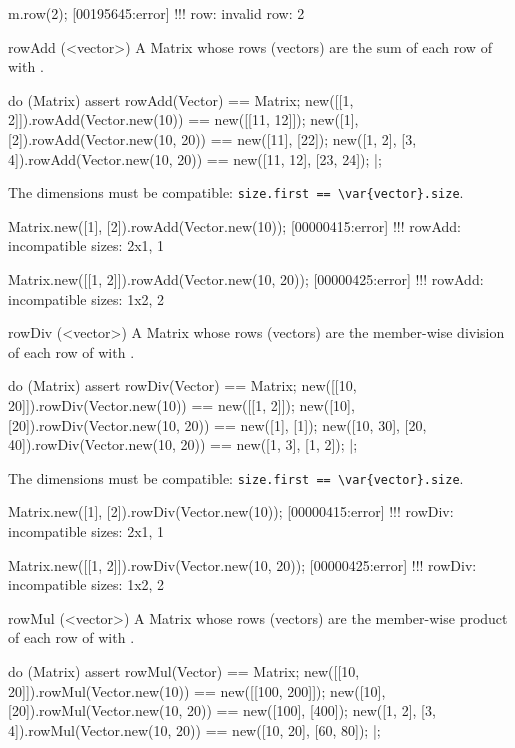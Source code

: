 \begin{urbiscriptapi}
\begin{urbiassert}
m.row(2);
[00195645:error] !!! row: invalid row: 2
\end{urbiassert}


\item[rowAdd](<vector>)%
  A Matrix whose rows (vectors) are the sum of each row of \this with
  .
\begin{urbiscript}
do (Matrix)
{
  assert
  {
    rowAdd(Vector) == Matrix;
    new([[1, 2]]).rowAdd(Vector.new(10))     == new([[11, 12]]);
    new([1], [2]).rowAdd(Vector.new(10, 20)) == new([11], [22]);
    new([1, 2], [3, 4]).rowAdd(Vector.new(10, 20)) == new([11, 12], [23, 24]);
  }
}|;
\end{urbiscript}

  The dimensions must be compatible:
  \lstinline|size.first == \var{vector}.size|.
\begin{urbiscript}
Matrix.new([1], [2]).rowAdd(Vector.new(10));
[00000415:error] !!! rowAdd: incompatible sizes: 2x1, 1

Matrix.new([[1, 2]]).rowAdd(Vector.new(10, 20));
[00000425:error] !!! rowAdd: incompatible sizes: 1x2, 2
\end{urbiscript}


\item[rowDiv](<vector>)%
  A Matrix whose rows (vectors) are the member-wise division of each row of
  \this with .
\begin{urbiscript}
do (Matrix)
{
  assert
  {
    rowDiv(Vector) == Matrix;
    new([[10, 20]]).rowDiv(Vector.new(10))     == new([[1, 2]]);
    new([10], [20]).rowDiv(Vector.new(10, 20)) == new([1], [1]);
    new([10, 30], [20, 40]).rowDiv(Vector.new(10, 20)) == new([1, 3], [1, 2]);
  }
}|;
\end{urbiscript}

  The dimensions must be compatible:
  \lstinline|size.first == \var{vector}.size|.
\begin{urbiscript}
Matrix.new([1], [2]).rowDiv(Vector.new(10));
[00000415:error] !!! rowDiv: incompatible sizes: 2x1, 1

Matrix.new([[1, 2]]).rowDiv(Vector.new(10, 20));
[00000425:error] !!! rowDiv: incompatible sizes: 1x2, 2
\end{urbiscript}


\item[rowMul](<vector>)%
  A Matrix whose rows (vectors) are the member-wise product of each row of
  \this with .
\begin{urbiscript}
do (Matrix)
{
  assert
  {
    rowMul(Vector) == Matrix;
    new([[10, 20]]).rowMul(Vector.new(10))     == new([[100, 200]]);
    new([10], [20]).rowMul(Vector.new(10, 20)) == new([100], [400]);
    new([1, 2], [3, 4]).rowMul(Vector.new(10, 20)) == new([10, 20], [60, 80]);
  }
}|;
\end{urbiscript}


\end{urbiscriptapi}
